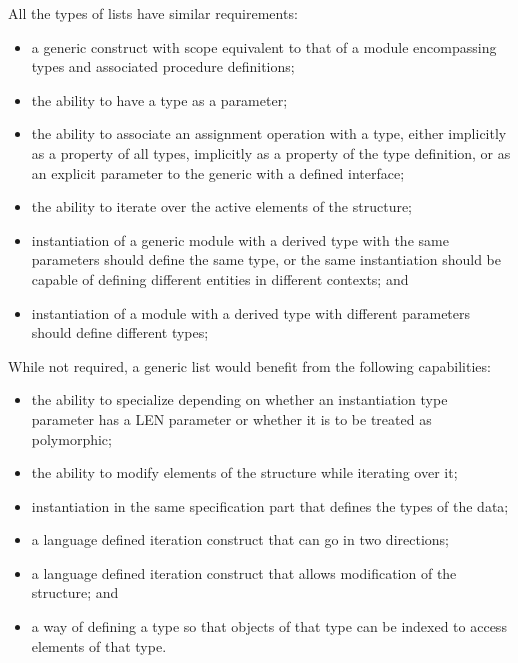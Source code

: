 \documentclass{article}
\newcounter{requirement}
\begin{document}
All the types of lists have similar requirements:
\begin{itemize}
\item a generic construct with scope equivalent to that of a module
  encompassing types and associated procedure definitions;

\item the ability to have a type as a parameter;

\item the ability to associate an assignment operation with a type, either
  implicitly as a property of all types, implicitly as a property of
  the type definition, or as an explicit parameter to the generic
  with a defined interface;

\item the ability to iterate over the active elements of the structure;

\item instantiation of a generic module with a derived type with the same
  parameters should define the same type, or the same instantiation
  should be capable of defining different entities in different
  contexts; and

\item instantiation of a module with a derived type with different
  parameters should define different types; 
\end{itemize}
While not required, a generic list would benefit from the
following capabilities:
\begin{itemize}

\item the ability to specialize depending on whether an instantiation
  type parameter has a LEN parameter or whether it is to be treated as
  polymorphic; 

\item the ability to modify elements of the structure while iterating over 
  it; 

\item instantiation in the same specification part that defines the types
  of the data;

\item a language defined iteration construct that can go in two
  directions;

\item a language defined iteration construct that allows modification of
  the structure; and

\item a way of defining a type so that objects of that type can be indexed
  to access elements of that type.

\end{itemize}
\end{document}
